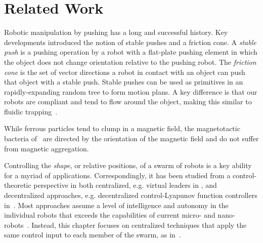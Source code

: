 
\section{Related Work}\label{sec:RelatedWork}




Robotic manipulation by pushing has a long and successful history\cite{Lynch1999,Lynch1996,Akella2000,Bernheisel2006}.  Key developments introduced the notion of stable pushes and a friction cone.  A \emph{stable push} is a pushing operation by a robot with a flat-plate pushing element in which the object does not change orientation relative to the pushing robot\cite{Lynch1999}.  The \emph{friction cone} is the set of vector directions a robot in contact with an object can push that object with a stable push.
Stable pushes can be used as primitives in an rapidly-expanding random tree to form motion plans.
A key difference is that our robots are compliant and tend to flow around the object, making this similar to fluidic trapping~\cite{Armani2006,Becker2009}.  

While ferrous particles tend to clump in a magnetic field, the magnetotactic bacteria of~\cite{martel2015magnetotactic,ou2012motion} are directed by the orientation of the magnetic field and do not suffer from magnetic aggregation.

Controlling the \emph{shape}, or relative positions, of a swarm of robots is a key ability for a myriad of applications.  Correspondingly, it has been studied from a control-theoretic perspective in  both centralized, e.g. virtual leaders in \cite{egerstedt2001formation}, and decentralized approaches, e.g. decentralized control-Lyapunov function controllers in~\cite{hsieh2008decentralized}. Most approaches assume a level of intelligence and autonomy in the individual robots that exceeds the capabilities of current micro- and nano-robots~\cite{martel2015magnetotactic,Xiaohui2015magnetiteMicroswimmers}.
Instead, this chapter focuses on centralized techniques that apply the same control input to each member of the swarm, as in~\cite{Becker2013b}.


